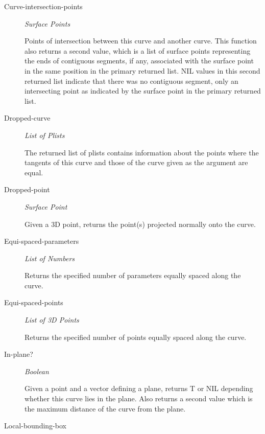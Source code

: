 \documentclass [11pt]{book}
\begin{document}
\begin{itemize}
\begin{description}
\item [Curve-intersection-points]
\emph{Surface Points}

  Points of intersection between this curve and another curve.
This function also returns a second value, which is a list of surface points representing the ends of
contiguous segments, if any, associated with the surface point in the same position in the primary returned list.
NIL values in this second returned list indicate that there was no contiguous segment, only an intersecting point
as indicated by the surface point in the primary returned list.




\item [Dropped-curve]
\emph{List of Plists}

 The returned list of plists contains information about the points where the tangents of this curve and those of the curve given as the argument
are equal.




\item [Dropped-point]
\emph{Surface Point}

 Given a 3D point, returns the point(s) projected normally onto the curve.




\item [Equi-spaced-parameters]
\emph{List of Numbers}

 Returns the specified number of parameters equally spaced along the curve.




\item [Equi-spaced-points]
\emph{List of 3D Points}

 Returns the specified number of points equally spaced along the curve.




\item [In-plane?]
\emph{Boolean}

 Given a point and a vector defining a plane, returns T or NIL depending whether this curve lies in the plane.
Also returns a second value which is the maximum distance of the curve from the plane.




\item [Local-bounding-box]


\end{description}
\end{itemize}
\end{document}
